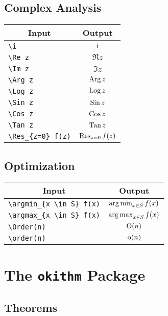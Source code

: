 \documentclass[a4paper, 11pt]{article}
\begin{document}
\subsection{Complex Analysis}
\begin{center}
  \begin{tabular}{lc} \toprule
    \multicolumn{1}{c}{Input} & Output            \\\midrule
    \verb|\i|   & $\mathrm{i}$              \\
    \verb|\Re z|   & $\Re z$           \\
    \verb|\Im z|   & $\Im z$           \\
    \verb|\Arg z|   & $\operatorname{Arg} z$          \\
    \verb|\Log z|   & $\operatorname{Log} z$          \\
    \verb|\Sin z|   & $\operatorname{Sin} z$          \\
    \verb|\Cos z|   & $\operatorname{Cos} z$          \\
    \verb|\Tan z|   & $\operatorname{Tan} z$          \\
    \verb|\Res_{z=0} f(z)|   & $\operatorname*{Res}_{z=0} f(z)$ \\
    \bottomrule
  \end{tabular}
\end{center}

\subsection{Optimization}
\begin{center}
  \begin{tabular}{lc} \toprule
    \multicolumn{1}{c}{Input} & Output                   \\\midrule
    \verb|\argmin_{x \in S} f(x)|   & $\operatorname*{arg\,min}_{x \in S} f(x)$ \\
    \verb|\argmax_{x \in S} f(x)|   & $\operatorname*{arg\,max}_{x \in S} f(x)$ \\
    \verb|\Order(n) |  & $\operatorname{O}(n)$              \\
    \verb|\order(n) |  & $\operatorname{o}(n)$              \\
    \bottomrule
  \end{tabular}
\end{center}

\section{The \texttt{okithm} Package}
\subsection{Theorems}
\end{document}
